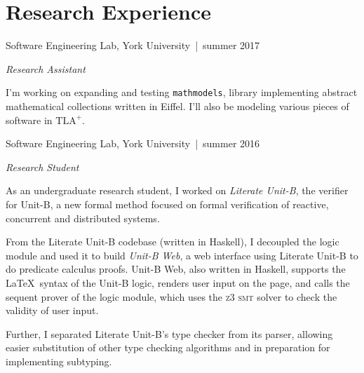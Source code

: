 \documentclass[12pt,letterpaper]{article}
\renewenvironment{itemize}{
  \begin{list}{}{
    \setlength{\leftmargin}{1.5em}
    \setlength{\itemsep}{0.25em}
    \setlength{\parskip}{0pt}
    \setlength{\parsep}{0.25em}
  }
}{
  \end{list}
}
\begin{document}
\section*{Research Experience}

\begin{itemize}
\item {\large Software Engineering Lab, } York University\, |\, {\small summer
  2017}

  \textit{Research Assistant}

  \begin{itemize}
  \item I'm working on expanding and testing \texttt{mathmodels},
    library implementing abstract mathematical collections written in Eiffel. I'll also
    be modeling various pieces of software in $\textrm{TLA}^+$.
  \end{itemize}

\item {\large Software Engineering Lab, } York University\, |\, {\small summer 2016}

  \textit{Research Student}

  \begin{itemize}
  \item As an undergraduate research student, I worked on \textit{Literate
      Unit-B}, the verifier for Unit-B, a new formal method focused on formal
    verification of reactive, concurrent and distributed systems.

    From the Literate Unit-B codebase (written in Haskell), I decoupled the
    logic module and used it to build \textit{Unit-B Web}, a web interface using
    Literate Unit-B to do predicate calculus proofs. \linebreak Unit-B Web, also
    written in Haskell, supports the \LaTeX\ syntax of the Unit-B logic, renders
    user input on the page, and calls the sequent prover of the logic module,
    which uses the \textsc{z3 smt} solver to check the validity of user input.

  \item Further, I separated Literate Unit-B's type checker from its parser,
    allowing easier substitution of other type checking algorithms and in
    preparation for implementing subtyping.
  \end{itemize}
\end{itemize}
\end{document}

